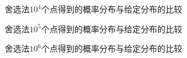 \documentclass[a4paper,11pt]{article}
\begin{document}
\begin{figure}[!htbp]        
\caption{\label{1} 舍选法$10^{4}$个点得到的概率分布与给定分布的比较}      
\end{figure}

\begin{figure}[!htbp]        
\caption{\label{1} 舍选法$10^{5}$个点得到的概率分布与给定分布的比较}      
\end{figure}

\begin{figure}[!htbp]        
\caption{\label{1} 舍选法$10^{6}$个点得到的概率分布与给定分布的比较}      
\end{figure}
\end{document}
